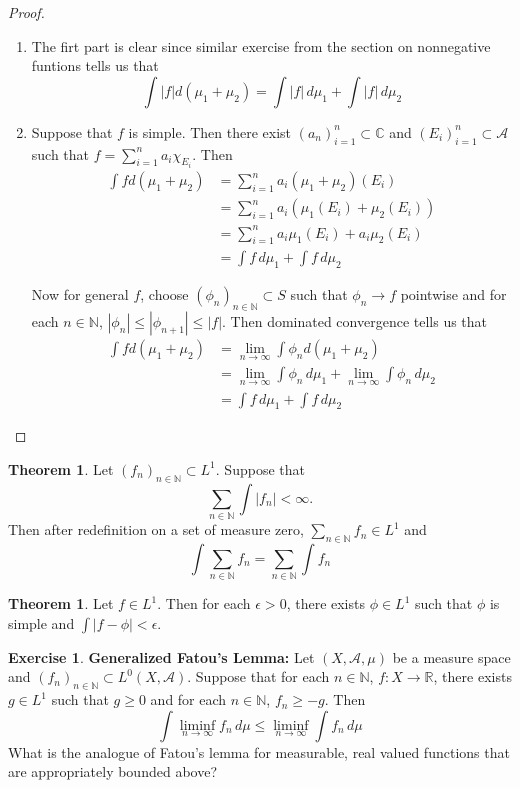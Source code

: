 \documentclass{book}
\theoremstyle{definition}
\newtheorem{thm}[definition]{Theorem}
\newtheorem{ex}[definition]{Exercise}
\newcommand{\ep}{\epsilon}
\newcommand{\C}{\mathbb{C}}
\newcommand{\N}{\mathbb{N}}
\newcommand{\R}{\mathbb{R}}
\newcommand{\MA}{\mathcal{A}}
\newcommand{\lex}[1]{\label{ex:#1}}
\DeclareMathOperator*{\0}{\mbf{0}}
\DeclareMathOperator*{\1}{\mbf{1}}
\newcommand{\limfn}{\liminf \limits_{n \rightarrow \infty}}
\newcommand{\limn}{\lim \limits_{n \rightarrow \infty}}
\newcommand{\dmu}{\, d \mu}
\begin{document}
	\begin{proof}
		\begin{enumerate}
			\item The firt part is clear since similar exercise from the section on nonnegative funtions tells us that $$\int |f| d(\mu_1 + \mu_2) = \int |f| \dmu_1 + \int |f| \dmu_2$$
			
			
			\item Suppose that $f$ is simple. Then there exist $(a_n)_{i=1}^n \subset \C$ and $(E_i)_{i=1}^n \subset \MA$ such that $f = \sum\limits_{i =1}^n a_i \chi_{E_i}$. Then 
			\begin{align*}
				\int f d(\mu_1 + \mu_2) 
				&= \sum\limits_{i =1}^n a_i (\mu_1 + \mu_2)(E_i)\\
				&= \sum\limits_{i =1}^n a_i (\mu_1(E_i) + \mu_2(E_i))\\
				&= \sum\limits_{i =1}^n a_i \mu_1(E_i) + a_i \mu_2(E_i)\\
				&= \int f \dmu_1 + \int f \dmu_2
			\end{align*}
			
			Now for general $f$, choose $(\phi_n)_{n \in \N} \subset S$ such that $\phi_n \rightarrow f$ pointwise and for each $n \in \N$, $|\phi_n| \leq |\phi_{n+1}| \leq |f|$. Then dominated convergence tells us that 
			\begin{align*}
				\int f d(\mu_1 + \mu_2) 
				&= \limn \int \phi_n d(\mu_1 + \mu_2)\\
				&= \limn \int \phi_n \dmu_1 + \limn \int \phi_n \dmu_2 \\
				&= \int f \dmu_1 + \int f \dmu_2
			\end{align*}
			
		\end{enumerate}
	\end{proof}
	
	\begin{thm}
		Let $(f_n)_{n \in \N} \subset L^1$. Suppose that $$\sum_{n \in \N} \int |f_n| < \infty.$$ Then after redefinition on a set of measure zero, $\sum_{n \in \N}f_n \in L^1$ and $$\int \sum_{n \in \N}f_n = \sum_{n \in \N} \int f_n$$
	\end{thm}
	
	\begin{thm}
		Let $f \in L^1$. Then for each $\ep > 0$, there exists $\phi \in L^1$ such that $\phi$ is simple and $\int |f - \phi| < \ep$. 
	\end{thm}
	
	\begin{ex} \lex{00000} \textbf{Generalized Fatou's Lemma:}
		Let $(X, \MA, \mu)$ be a measure space and $(f_n)_{n \in \N} \subset L^0(X, \MA)$. Suppose that for each $n \in \N$, $f:X \rightarrow \R$, there exists $g \in L^1$ such that $g \geq 0$ and for each $n \in \N$, $f_n \geq -g$. Then 
		$$ \int \limfn f_n \dmu \leq \limfn \int f_n \dmu $$ 
		What is the analogue of Fatou's lemma for measurable, real valued functions that are appropriately bounded above?  
	\end{ex}
	
\end{document}
